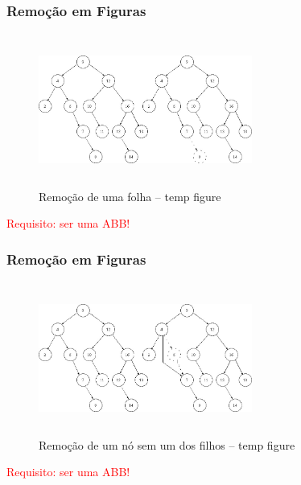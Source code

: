 \begin{frame}

\frametitle{Remoção em Figuras}

   \begin{figure}[!ht]
    \centering
    \includegraphics[width=7cm, height=5cm]{figs/fig_arvores/remove0_arvore.jpg}
    \caption{Remoção de uma folha -- temp figure}
    \end{figure}

\begin{flushleft}
\textcolor{red}{Requisito: ser uma ABB!}
\end{flushleft}


\end{frame}
\begin{frame}

\frametitle{Remoção em Figuras}

   \begin{figure}[!ht]
    \centering
    \includegraphics[width=7cm, height=5cm]{figs/fig_arvores/remove1_arvore.jpg}
    \caption{Remoção de um nó sem um dos filhos -- temp figure}
    \end{figure}

\begin{flushleft}
\textcolor{red}{Requisito: ser uma ABB!}
\end{flushleft}


\end{frame}

